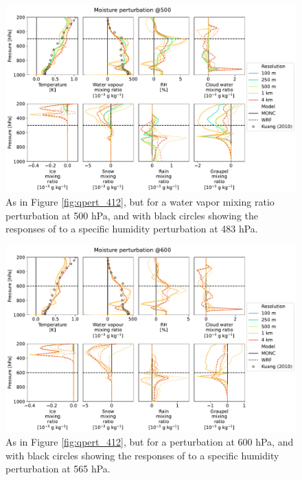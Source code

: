 \documentclass[draft]{agujournal2019}
\begin{document}
\begin{figure}[pth]
    \noindent\includegraphics[width=\textwidth]{figures/pert_diffs_q_0.0002_@500}
    \caption{As in Figure \ref{fig:qpert_412}, but for a water vapor mixing
    ratio perturbation at 500 hPa, and with black circles showing the responses
    of  to a specific humidity perturbation at 483 hPa.}
    \label{fig:qpert_500}
\end{figure}

\begin{figure}[pth]
    \noindent\includegraphics[width=\textwidth]{figures/pert_diffs_q_0.0002_@600}
    \caption{As in Figure \ref{fig:qpert_412}, but for a perturbation at 600
    hPa, and with black circles showing the responses of 
    to a specific humidity perturbation at 565 hPa.}
    \label{fig:qpert_600}
\end{figure}
\end{document}
